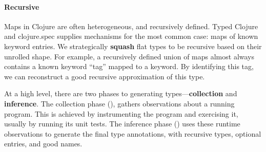 \paragraph{Recursive}
Maps in Clojure are often heterogeneous, and recursively defined.
Typed Clojure and clojure.spec supplies mechanisms for the most
common case: maps of known keyword entries.
We strategically \textbf{squash} flat types to be recursive
based on their unrolled shape.
For example, a recursively defined union of maps almost always
contains a known keyword ``tag'' mapped to a keyword.
By identifying this tag, we can reconstruct a good recursive
approximation of this type.

%
%
%
%
%


%
At a high level, there are two phases to
generating types---\textbf{collection} and
\textbf{inference}.
%
The collection phase (),
gathers observations about a running program.
This is achieved by instrumenting the program and exercising
it, usually by running its unit tests.
%
The inference phase ()
uses these runtime observations to generate the final type annotations,
with recursive types, optional entries, and good names.

